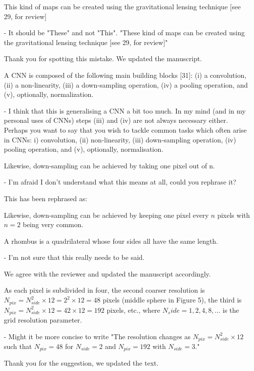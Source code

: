 \documentclass[12pt,a4paper]{article}
\newcommand{\nati}[1]{{\color[rgb]{.1,.6,.1}{NP: #1}}}
\newcommand{\todo}[1]{{\color[rgb]{.6,.1,.6}{TODO: #1}}}
\newcommand{\1}{\b{1}}              %
\newcommand{\0}{\b{0}}              %
\begin{document}
\begin{mdframed}[style=comment]
This kind of maps can be created using the gravitational lensing technique [see 29, for review]

- It should be "These" and not "This". "These kind of maps can be created using the gravitational lensing technique [see 29, for review]"
\end{mdframed}
Thank you for spotting this mistake. We updated the manuscript.

\begin{mdframed}[style=comment]
A CNN is composed of the following main building blocks [31]: (i) a convolution, (ii) a non-linearity, (iii) a down-sampling operation, (iv) a pooling operation, and (v), optionally, normalization.

- I think that this is generalising a CNN a bit too much. In my mind (and in my personal uses of CNNs) steps (iii) and (iv) are not always necessary either. Perhaps you want to say that you wish to tackle common tasks which often arise in CNNs: i) convolution, (ii) non-linearity, (iii) down-sampling operation, (iv) pooling operation, and (v), optionally, normalisation.
\end{mdframed}
\todo{assigned: @michael}
\nati{I do not know what to say. I just do not care what is the definition of a CNN.stat}

\begin{mdframed}[style=comment]
Likewise, down-sampling can be achieved by taking one pixel out of n.

- I'm afraid I don't understand what this means at all, could you rephrase it?
\end{mdframed}
This has been rephrased as:
\begin{mdframed}[style=manuscript]
Likewise, down-sampling can be achieved by keeping one pixel every $n$ pixels with $n=2$ being very common.
\end{mdframed}

\begin{mdframed}[style=comment]
A rhombus is a quadrilateral whose four sides all have the same length.

- I'm not sure that this really needs to be said.
\end{mdframed}
We agree with the reviewer and updated the manuscript accordingly.

\begin{mdframed}[style=comment]
As each pixel is subdivided in four, the second coarser resolution is $N_{pix} = N_{side}^2\times12=2^2\times12=48$ pixels (middle sphere in Figure 5), the third is $N_{pix} = N_{side}^2\times12=42\times12=192$ pixels, etc., where $N_side =1,2,4,8,\dots$ is the grid resolution parameter.

- Might it be more concise to write "The resolution changes as $N_{pix} = N^2_{side}\times12$ such that $N_{pix} = 48$ for $N_{side} = 2$ and $N_{pix} = 192$ with $N_{side}=3$."
\end{mdframed}
Thank you for the suggestion, we updated the text.
\end{document}
